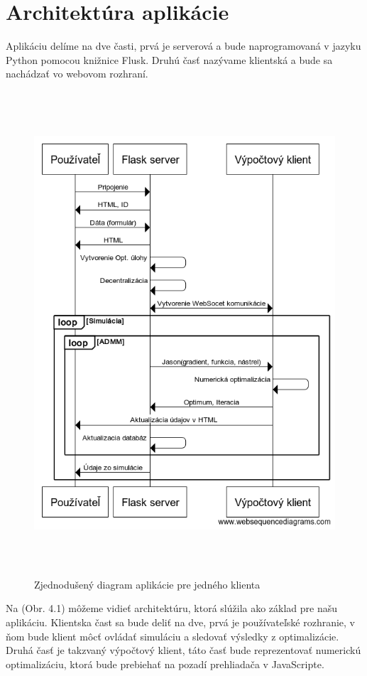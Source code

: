\section{Architektúra aplikácie}
Aplikáciu delíme na dve časti, prvá je serverová a bude naprogramovaná v jazyku Python pomocou knižnice Flusk. Druhú časť nazývame klientská a bude sa nachádzať vo webovom rozhraní.
\label{fig:ArchitekturaAPK}
\begin{figure}[H]	
	\centering
	\includegraphics[width=13cm,height=18cm]{images/Aplikacia}
	\caption{Zjednodušený diagram aplikácie pre jedného klienta}
\end{figure}
\newpage
Na (Obr. 4.1) môžeme vidieť architektúru, ktorá slúžila ako základ pre našu aplikáciu. Klientska čast sa bude deliť na dve, prvá je používateľské rozhranie, v ňom bude klient môcť ovládať simuláciu a sledovať výsledky z optimalizácie. Druhá časť je takzvaný výpočtový klient, táto časť bude reprezentovať numerickú optimalizáciu, ktorá bude prebiehať na pozadí prehliadača v JavaScripte. 
